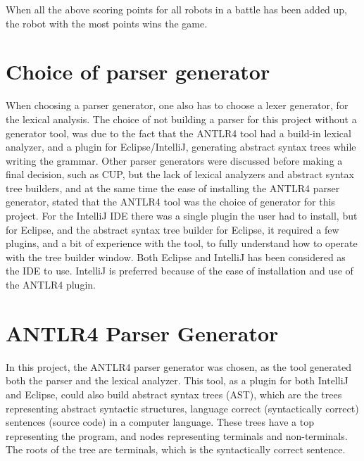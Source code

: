 When all the above scoring points for all robots in a battle has been added up, the robot with the most points wins the game.


\section{Choice of parser generator}
When choosing a parser generator, one also has to choose a lexer generator, for the lexical analysis. The choice of not building a parser for this project without a generator tool, was due to the fact that the ANTLR4 tool had a build-in lexical analyzer, and a plugin for Eclipse/IntelliJ, generating abstract syntax trees while writing the grammar. Other parser generators were discussed before making a final decision, such as CUP, but the lack of lexical analyzers and abstract syntax tree builders, and at the same time the ease of installing the ANTLR4 parser generator, stated that the ANTLR4 tool was the choice of generator for this project. For the IntelliJ IDE there was a single plugin the user had to install, but for Eclipse, and the abstract syntax tree builder for Eclipse, it required a few plugins, and a bit of experience with the tool, to fully understand how to operate with the tree builder window. Both Eclipse and IntelliJ has been considered as the IDE to use. IntelliJ is preferred because of the ease of installation and use of the ANTLR4 plugin.
 
\section{ANTLR4 Parser Generator}
In this project, the ANTLR4 parser generator was chosen, as the tool generated both the parser and the lexical analyzer. This tool, as a plugin for both IntelliJ and Eclipse, could also build abstract syntax trees (AST), which are the trees representing abstract syntactic structures, language correct (syntactically correct) sentences (source code) in a computer language. These trees have a top representing the program, and nodes representing terminals and non-terminals. The roots of the tree are terminals, which is the syntactically correct sentence.

